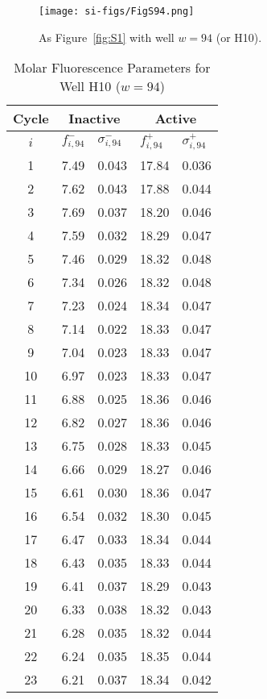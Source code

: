                 \begin{figure}
                    \centering
                    \texttt{[image: si-figs/FigS94.png]}
                    \caption{
                        As Figure~\ref{fig:S1} with well $w=94$ (or H10).
                    }
                \end{figure}
                \clearpage
    \begin{table}
        \caption{Molar Fluorescence Parameters for Well H10 ($w=94$)}
        \centering
        \begin{tabular}{c|ll|ll}
            Cycle & \multicolumn{2}{c|}{Inactive} & \multicolumn{2}{c}{Active} \\
            \hline
            $i$ & $f_{i,94}^{-}$ & $\sigma_{i,94}^{-}$ &  $f_{i,94}^{+}$ & $\sigma_{i,94}^{+}$ \\
            \hline
    1 & 7.49 & 0.043 & 17.84 & 0.036 \\
2 & 7.62 & 0.043 & 17.88 & 0.044 \\
3 & 7.69 & 0.037 & 18.20 & 0.046 \\
4 & 7.59 & 0.032 & 18.29 & 0.047 \\
5 & 7.46 & 0.029 & 18.32 & 0.048 \\
6 & 7.34 & 0.026 & 18.32 & 0.048 \\
7 & 7.23 & 0.024 & 18.34 & 0.047 \\
8 & 7.14 & 0.022 & 18.33 & 0.047 \\
9 & 7.04 & 0.023 & 18.33 & 0.047 \\
10 & 6.97 & 0.023 & 18.33 & 0.047 \\
11 & 6.88 & 0.025 & 18.36 & 0.046 \\
12 & 6.82 & 0.027 & 18.36 & 0.046 \\
13 & 6.75 & 0.028 & 18.33 & 0.045 \\
14 & 6.66 & 0.029 & 18.27 & 0.046 \\
15 & 6.61 & 0.030 & 18.36 & 0.047 \\
16 & 6.54 & 0.032 & 18.30 & 0.045 \\
17 & 6.47 & 0.033 & 18.34 & 0.044 \\
18 & 6.43 & 0.035 & 18.33 & 0.044 \\
19 & 6.41 & 0.037 & 18.29 & 0.043 \\
20 & 6.33 & 0.038 & 18.32 & 0.043 \\
21 & 6.28 & 0.035 & 18.32 & 0.044 \\
22 & 6.24 & 0.035 & 18.35 & 0.044 \\
23 & 6.21 & 0.037 & 18.34 & 0.042 \\

\end{tabular}
\end{table}
